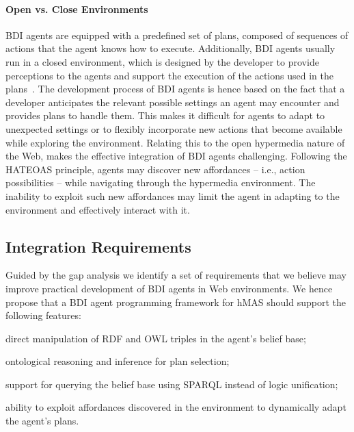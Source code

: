 \documentclass[
]{ceurart}
\begin{document}
\paragraph{Open vs. Close Environments}

\ac{BDI} agents are equipped with a predefined set of plans, composed of sequences of actions that the agent knows how to execute.
%
Additionally, \ac{BDI} agents usually run in a closed environment,
which is designed by the developer to provide perceptions to the agents and 
support the execution of the actions used in the plans~\cite{weyns2007aamas}. 
%
The development process of \ac{BDI} agents is hence based on the fact that a developer anticipates 
the relevant possible settings an agent may encounter and provides plans to handle them.
%
This makes it difficult for agents to adapt to unexpected settings or to flexibly incorporate new actions that become available while exploring the environment.
%
Relating this to the open hypermedia nature of the Web, makes the effective integration of \ac{BDI} agents challenging.
%
Following the \ac{HATEOAS} principle, agents may discover new affordances
-- i.e., action possibilities --
while navigating through the hypermedia environment.
%
The inability to exploit such new affordances may limit the agent in adapting to the environment and effectively interact with it.

\subsection{Integration Requirements}
\label{sec:integrating-bdi-hypermedia}

Guided by the gap analysis
we identify a set of requirements that we believe may improve practical development of \ac{BDI} agents in Web environments.
We hence propose that a \ac{BDI} agent programming framework for \ac{hMAS} should support the following features:
\begin{enumerate*}[label={(R\arabic*)}]
  \item direct manipulation of \ac{RDF} and \ac{OWL} triples in the agent's belief base;
  \label{req:direct}
  \item ontological reasoning and inference for plan selection;
  \label{req:reasoning}
  \item support for querying the belief base using \acs{SPARQL} instead of logic unification;
  \label{req:query}
  \item ability to exploit affordances discovered in the environment to dynamically adapt the agent's plans.
  \label{req:actions}
\end{enumerate*}
\end{document}
